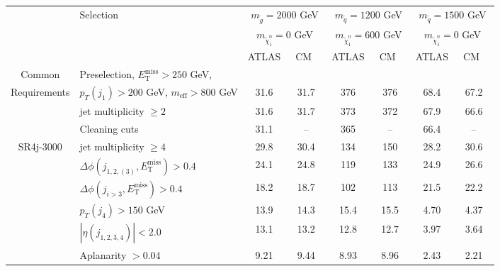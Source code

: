 \documentclass[10pt,fleqn]{article}
\newcommand{\met}{E^\mathrm{miss}_\mathrm{T}}
\newcommand{\meff}{m_\mathrm{eff}}
\begin{document}
\begin{table}[h!] 
 \renewcommand*{\arraystretch}{1.}
 \begin{tabular}{c|l|c|c|c|c|c|c} \toprule
      & Selection & \multicolumn{2}{c|}{$m_{\tilde{g}} = 2000$ GeV}      & \multicolumn{2}{c|}{$m_{\tilde{q}} = 1200$ GeV}         & \multicolumn{2}{c}{$m_{\tilde{q}} = 1500$ GeV}         \\ 
      &           & \multicolumn{2}{c|}{$m_{\tilde{\chi}^0_1} = 0$ GeV}  & \multicolumn{2}{c|}{$m_{\tilde{\chi}^0_1} = 600$ GeV}   & \multicolumn{2}{c}{$m_{\tilde{\chi}^0_1} = 0$ GeV}     \\ \midrule
      &           & ATLAS             &  ~CM~~                           & ATLAS             & ~CM~~                            & ATLAS             & ~CM~~                            \\ \midrule
Common& Preselection, $\met > 250$ GeV,&          &   &   &  & & \\ 
Requirements & $p_T(j_1) > 200$ GeV, $\meff > 800$ GeV         &     31.6   &   31.7    &  376       &   376     &      68.4    &   67.2         \\
             & jet multiplicity $\geq 2$                       &     31.6   &   31.7    &  373       &   372     &      67.9    &   66.6         \\
             & Cleaning cuts                                   &     31.1   &   --      &  365       &   --      &      66.4    &   --          \\ \midrule
SR4j-3000    & jet multiplicity $\geq 4$                       &     29.8   &   30.4    &  134       &   150     &      28.2    &   30.6         \\
             & $\Delta\phi(j_{1,2,(3)},\met) > 0.4$            &     24.1   &   24.8    &  119       &   133     &      24.9    &   26.6         \\
             & $\Delta\phi(j_{i>3},\met) > 0.4$                &     18.2   &   18.7    &  102       &   113     &      21.5    &   22.2         \\
             & $p_T(j_4) > 150$ GeV                            &     13.9   &   14.3    &  15.4      &   15.5    &      4.70    &   4.37         \\      
             & $|\eta(j_{1,2,3,4})|< 2.0$                      &     13.1   &   13.2    &  12.8      &   12.7    &      3.97    &   3.64         \\           
             & Aplanarity $> 0.04$                             &     9.21   &   9.44    &  8.93      &   8.96    &      2.43    &   2.21         \\           

\end{tabular}
\end{table}
\end{document}

